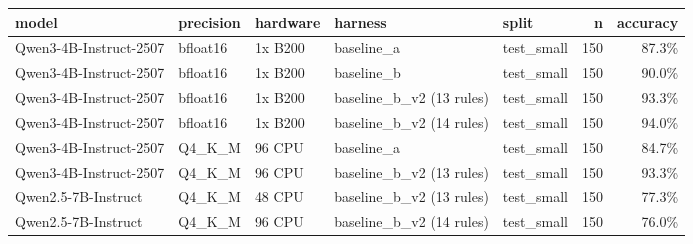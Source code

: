 \begin{tabular}{lllllrr}
\toprule
model & precision & hardware & harness & split & n & accuracy \\
\midrule
Qwen3-4B-Instruct-2507 & bfloat16 & 1x B200 & baseline\_a & test\_small & 150 & 87.3\% \\
Qwen3-4B-Instruct-2507 & bfloat16 & 1x B200 & baseline\_b & test\_small & 150 & 90.0\% \\
Qwen3-4B-Instruct-2507 & bfloat16 & 1x B200 & baseline\_b\_v2 (13 rules) & test\_small & 150 & 93.3\% \\
Qwen3-4B-Instruct-2507 & bfloat16 & 1x B200 & baseline\_b\_v2 (14 rules) & test\_small & 150 & 94.0\% \\
Qwen3-4B-Instruct-2507 & Q4\_K\_M & 96 CPU & baseline\_a & test\_small & 150 & 84.7\% \\
Qwen3-4B-Instruct-2507 & Q4\_K\_M & 96 CPU & baseline\_b\_v2 (13 rules) & test\_small & 150 & 93.3\% \\
Qwen2.5-7B-Instruct & Q4\_K\_M & 48 CPU & baseline\_b\_v2 (13 rules) & test\_small & 150 & 77.3\% \\
Qwen2.5-7B-Instruct & Q4\_K\_M & 96 CPU & baseline\_b\_v2 (14 rules) & test\_small & 150 & 76.0\% \\
\bottomrule
\end{tabular}
